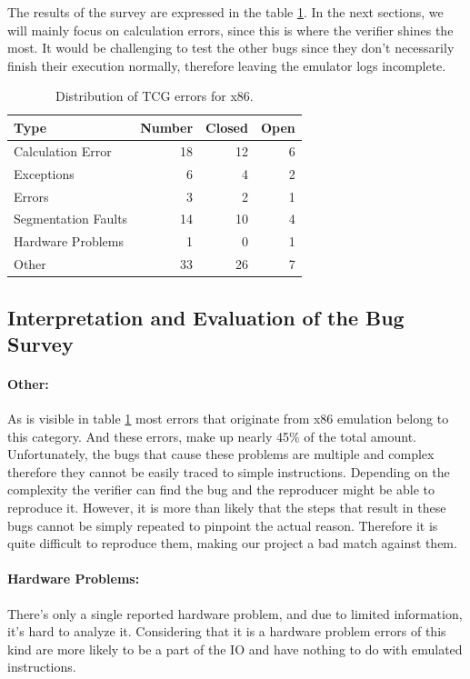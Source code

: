 The results of the survey are expressed in the table \ref{tab:tcg_x86}.
In the next sections, we will mainly focus on calculation errors, since this is where the verifier shines the most.
It would be challenging to test the other bugs since they don't necessarily finish their execution normally, therefore leaving the emulator logs incomplete.

\begin{table}[htpb]
    \caption[x86 TCG error distribution]{Distribution of TCG errors for x86.}\label{tab:tcg_x86}
    \centering
    \begin{tabular}{l r r r}
      \toprule
        Type & Number & Closed & Open \\
      \midrule
        Calculation Error & 18 & 12 & 6 \\
        Exceptions & 6 & 4 & 2 \\
        Errors & 3 & 2 & 1 \\
        Segmentation Faults & 14 & 10 & 4 \\
        Hardware Problems & 1 & 0 & 1 \\
        Other & 33 & 26 & 7 \\
      \bottomrule
    \end{tabular}
\end{table}

\subsection{Interpretation and Evaluation of the Bug Survey}

\paragraph{Other:}
As is visible in table \ref{tab:tcg_x86} most errors that originate from x86 emulation belong to this category.
And these errors, make up nearly 45\% of the total amount.
Unfortunately, the bugs that cause these problems are multiple and complex therefore they cannot be easily traced to simple instructions.
Depending on the complexity the verifier can find the bug and the reproducer might be able to reproduce it.
However, it is more than likely that the steps that result in these bugs cannot be simply repeated to pinpoint the actual reason.
Therefore it is quite difficult to reproduce them, making our project a bad match against them.

\paragraph{Hardware Problems:}
There's only a single reported hardware problem, and due to limited information, it's hard to analyze it.
Considering that it is a hardware problem errors of this kind are more likely to be a part of the IO and have nothing to do with emulated instructions.


